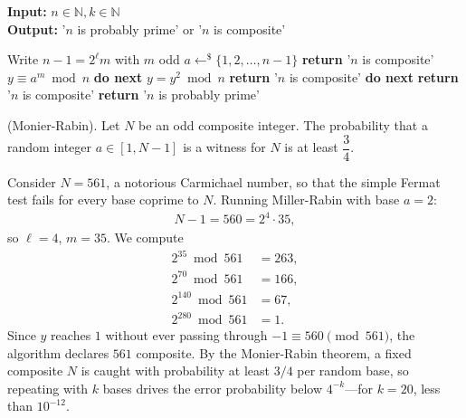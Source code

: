 \documentclass[a4paper, 12pt]{book} %
\begin{document}
\begin{algorithm}
\caption{Miller-Rabin Algorithm with $k$ runs}
\textbf{Input:} $n \in \mathbb{N}, k \in \mathbb{N}$ \\
\textbf{Output:} '$n$ is probably prime' or '$n$ is composite'
\begin{algorithmic}[1]
\STATE Write $n - 1 = 2^\ell m$ with $m$ odd
    \STATE $a \leftarrow^{\$} \{1, 2, \dots, n - 1\}$ 
        \STATE \textbf{return} '$n$ is composite'
    \ENDIF
    \STATE $y \equiv a^m \bmod n$
        \STATE \textbf{do next} 
    \ENDIF
        \STATE $y = y^2 \bmod n$
            \STATE \textbf{return} '$n$ is composite' 
        \ENDIF
            \STATE \textbf{do next} 
        \ENDIF
    \ENDFOR
    \STATE \textbf{return} '$n$ is composite' 
\ENDFOR
\STATE \textbf{return} '$n$ is probably prime'
\end{algorithmic}
\end{algorithm}

\begin{theorem}
    (Monier-Rabin). Let $N$ be an odd composite integer. The probability that a random integer $a \in [1, N -1]$ is a witness for $N$ is at least $\dfrac{3}{4}$.
\end{theorem}

\begin{example}
    Consider $N = 561$, a notorious Carmichael number, so that the simple Fermat test fails for every base coprime to $N$. Running Miller-Rabin with base $a = 2$:
    \begin{align}
        N - 1 = 560 = 2^4 \cdot 35,
    \end{align}
    so $\ell = 4$, $m = 35$. We compute
    \begin{align}
        2^{35} \bmod 561 &= 263, \\
        2^{70}  \bmod 561 &= 166, \\
        2^{140} \bmod 561 &= 67, \\
        2^{280} \bmod 561 &= 1.
    \end{align}
    Since $y$ reaches $1$ without ever passing through $-1 \equiv 560 \pmod{561}$, the algorithm declares $561$ composite. By the Monier-Rabin theorem, a fixed composite $N$ is caught with probability at least $3/4$ per random base, so repeating with $k$ bases drives the error probability below $4^{-k}$---for $k = 20$, less than $10^{-12}$.
\end{example}
\end{document}
